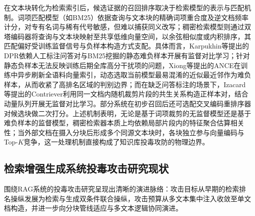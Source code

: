 在文本块转化为检索索引后，候选证据的召回排序取决于检索模型的表示与匹配机制。词项匹配模型（如BM25\cite{robertson2009probabilistic}）依据查询与文本块的精确词项重合度及逆文档频率计分，对专有名词与稀有代号敏感，但难以捕获同义改写；稠密检索模型则通过双塔编码器将查询与文本块映射至共享低维向量空间，以余弦相似度或内积排序，其匹配偏好受训练监督信号与负样本构造方式支配。具体而言，Karpukhin等\cite{karpukhin2020dense}提出的DPR依赖人工标注问答对与BM25挖掘的静态难负样本开展有监督对比学习；针对静态负样本无法反映训练后期全库高分干扰项的问题，Xiong等\cite{xiong2021approximate}提出的ANCE在训练中异步刷新全语料向量索引，动态选取当前模型最易混淆的近似最近邻作为难负样本，从而收紧了高排名区域的判别边界；而在缺乏问答标注的场景下，Izacard等\cite{izacard2022unsupervised}提出的Contriever利用同一文档内随机裁剪片段的共生关系构造正样本对，结合动量队列开展无监督对比学习。部分系统在初步召回后还可选配交叉编码重排序器对候选块做二次打分\cite{gao2023retrieval}。上述机制表明，无论是基于词项裁剪的无监督模型还是基于难负样本的监督模型，稠密检索器本质上均依赖局部片段内的特征聚合估算相关性；当外部文档在摄入分块后形成多个同源文本块时，各块独立参与向量编码与Top-$K$竞争，这一处理机制直接构成了知识库投毒攻防的物理边界。

\subsection{检索增强生成系统投毒攻击研究现状}

围绕RAG系统的投毒攻击研究呈现出清晰的演进脉络：攻击目标从早期的检索排名操纵发展为检索与生成双条件联合操纵，攻击预算从多文本集中注入收敛至单文档构造，并进一步向分块管线适应与多文本逻辑协同演进。


